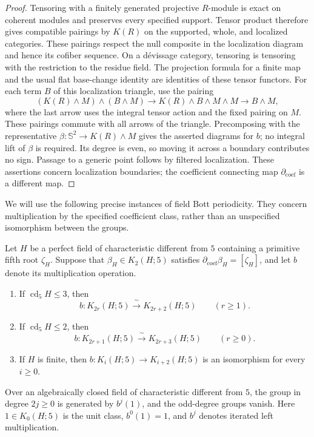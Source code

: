 \begin{proof}
Tensoring with a finitely generated projective $R$-module is exact on
coherent modules and preserves every specified support.  Tensor product
therefore gives compatible pairings by $K(R)$ on the supported, whole,
and localized categories.  These pairings respect the null composite
in the localization diagram and hence its cofiber sequence.  On a
d\'evissage category, tensoring is tensoring with the restriction to the
residue field.  The projection formula for a finite map and the usual
flat base-change identity are identities of these tensor functors.
For each term $B$ of this localization triangle, use the pairing
\[
 (K(R)\wedge M)\wedge(B\wedge M)
 \longrightarrow K(R)\wedge B\wedge M\wedge M
 \longrightarrow B\wedge M,
\]
where the last arrow uses the integral tensor action and the fixed
pairing on $M$. These pairings commute with all arrows of the triangle.
Precomposing with the representative
$\beta:\mathbb S^2\to K(R)\wedge M$ gives the asserted diagrams for
$b$; no integral lift of $\beta$ is required.  Its degree is even, so moving it across a boundary contributes
no sign. Passage to a generic point follows by filtered localization. These assertions concern localization boundaries; the coefficient connecting map $\partial_{\mathrm{coef}}$ is a different map.
\end{proof}

We will use the following precise instances of field Bott periodicity.
They concern multiplication by the specified coefficient class, rather
than an unspecified isomorphism between the groups.

\begin{lemma}
\label{lem:bott}
Let $H$ be a perfect field of characteristic different from $5$
containing a primitive fifth root $\zeta_H$.  Suppose that
$\beta_H\in K_2(H;5)$ satisfies
$\partial_{\mathrm{coef}}\beta_H=[\zeta_H]$, and let $b$ denote its
multiplication operation.
\begin{enumerate}
 \item If $\operatorname{cd}_5H\leq3$, then
 \[
 b:K_{2r}(H;5)\xrightarrow{\ \sim\ }K_{2r+2}(H;5)
 \qquad(r\geq1).
 \]
 \item If $\operatorname{cd}_5H\leq2$, then
 \[
 b:K_{2r+1}(H;5)\xrightarrow{\ \sim\ }K_{2r+3}(H;5)
 \qquad(r\geq0).
 \]
 \item If $H$ is finite, then $b:K_i(H;5)\to K_{i+2}(H;5)$
 is an isomorphism for every $i\geq0$.
\end{enumerate}
Over an algebraically closed field of characteristic different from
$5$, the group in degree $2j\geq0$ is generated by $b^j(1)$, and the
odd-degree groups vanish. Here $1\in K_0(H;5)$ is the unit class,
$b^0(1)=1$, and $b^j$ denotes iterated left multiplication.
\end{lemma}

